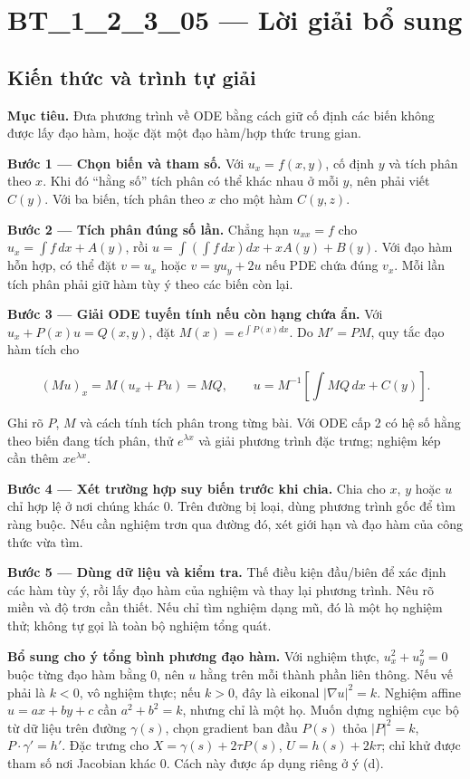 \documentclass[10pt,a4paper]{article}
\begin{document}
\section*{BT\_1\_2\_3\_05 — Lời giải bổ sung}
\subsection*{Kiến thức và trình tự giải}
\textbf{Mục tiêu.} Đưa phương trình về ODE bằng cách giữ cố định các biến không được lấy đạo hàm, hoặc đặt một đạo hàm/hợp thức trung gian.

\textbf{Bước 1 — Chọn biến và tham số.} Với $u_x=f(x,y)$, cố định $y$ và tích phân theo $x$. Khi đó “hằng số” tích phân có thể khác nhau ở mỗi $y$, nên phải viết $C(y)$. Với ba biến, tích phân theo $x$ cho một hàm $C(y,z)$.

\textbf{Bước 2 — Tích phân đúng số lần.} Chẳng hạn $u_{xx}=f$ cho $u_x=\int f\,dx+A(y)$, rồi $u=\int(\int f\,dx)dx+xA(y)+B(y)$. Với đạo hàm hỗn hợp, có thể đặt $v=u_x$ hoặc $v=yu_y+2u$ nếu PDE chứa đúng $v_x$. Mỗi lần tích phân phải giữ hàm tùy ý theo các biến còn lại.

\textbf{Bước 3 — Giải ODE tuyến tính nếu còn hạng chứa ẩn.} Với $u_x+P(x)u=Q(x,y)$, đặt $M(x)=e^{\int P(x)dx}$. Do $M'=PM$, quy tắc đạo hàm tích cho

\[
(Mu)_x=M(u_x+Pu)=MQ,\qquad
u=M^{-1}\left[\int MQ\,dx+C(y)\right].
\]

Ghi rõ $P$, $M$ và cách tính tích phân trong từng bài. Với ODE cấp 2 có hệ số hằng theo biến đang tích phân, thử $e^{\lambda x}$ và giải phương trình đặc trưng; nghiệm kép cần thêm $xe^{\lambda x}$.

\textbf{Bước 4 — Xét trường hợp suy biến trước khi chia.} Chia cho $x$, $y$ hoặc $u$ chỉ hợp lệ ở nơi chúng khác 0. Trên đường bị loại, dùng phương trình gốc để tìm ràng buộc. Nếu cần nghiệm trơn qua đường đó, xét giới hạn và đạo hàm của công thức vừa tìm.

\textbf{Bước 5 — Dùng dữ liệu và kiểm tra.} Thế điều kiện đầu/biên để xác định các hàm tùy ý, rồi lấy đạo hàm của nghiệm và thay lại phương trình. Nêu rõ miền và độ trơn cần thiết. Nếu chỉ tìm nghiệm dạng mũ, đó là một họ nghiệm thử; không tự gọi là toàn bộ nghiệm tổng quát.

\textbf{Bổ sung cho ý tổng bình phương đạo hàm.} Với nghiệm thực, $u_x^2+u_y^2=0$ buộc từng đạo hàm bằng 0, nên $u$ hằng trên mỗi thành phần liên thông. Nếu vế phải là $k<0$, vô nghiệm thực; nếu $k>0$, đây là eikonal $|\nabla u|^2=k$. Nghiệm affine $u=ax+by+c$ cần $a^2+b^2=k$, nhưng chỉ là một họ. Muốn dựng nghiệm cục bộ từ dữ liệu trên đường $\gamma(s)$, chọn gradient ban đầu $P(s)$ thỏa $|P|^2=k$, $P\cdot\gamma'=h'$. Đặc trưng cho $X=\gamma(s)+2\tau P(s)$, $U=h(s)+2k\tau$; chỉ khử được tham số nơi Jacobian khác 0. Cách này được áp dụng riêng ở ý (d).
\end{document}
